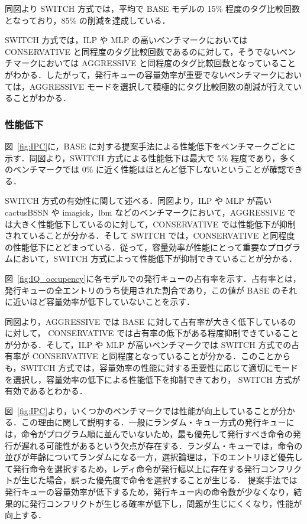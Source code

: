 \documentclass[submit,techrep,noauthor]{ipsj}
\newcommand{\fig}[1]{{図~\ref{fig:#1}}}
\begin{document}
同図より SWITCH 方式では，平均で BASE モデルの 15\% 程度のタグ比較回数となっており，85\% の削減を達成している．

SWITCH 方式では，ILP や MLP の高いベンチマークにおいてはCONSERVATIVE と同程度のタグ比較回数であるのに対して，そうでないベンチマークにおいては AGGRESSIVE と同程度のタグ比較回数となっていることがわかる．したがって，発行キューの容量効率が重要でないベンチマークにおいては，AGGRESSIVE モードを選択して積極的にタグ比較回数の削減が行えていることがわかる．

\subsubsection{性能低下}
\fig{IPC}に，BASE に対する提案手法による性能低下をベンチマークごとに示す．同図より，SWITCH 方式による性能低下は最大で 5\% 程度であり，多くのベンチマークでは 0\% に近く性能はほとんど低下しないということが確認できる．

SWITCH 方式の有効性に関して述べる．同図より，ILP や MLP が高い cactusBSSN や imagick，lbm などのベンチマークにおいて，AGGRESSIVE では大きく性能低下しているのに対して，CONSERVATIVE では性能低下が抑制されていることが分かる．そして SWITCH では，CONSERVATIVE と同程度の性能低下にとどまっている．従って，容量効率が性能にとって重要なプログラムにおいて，SWITCH 方式によって性能低下が抑制できていることが分かる．

\fig{IQ_occupency}に各モデルでの発行キューの占有率を示す．占有率とは，発行キューの全エントリのうち使用された割合であり，この値が BASE のそれに近いほど容量効率が低下していないことを示す．

同図より，AGGRESSIVE では BASE に対して占有率が大きく低下しているのに対して， CONSERVATIVE では占有率の低下がある程度抑制できていることが分かる．そして，ILP や MLP が高いベンチマークでは SWITCH 方式での占有率が CONSERVATIVE と同程度となっていることが分かる．このことからも，SWITCH 方式では，容量効率の性能に対する重要性に応じて適切にモードを選択し，容量効率の低下による性能低下を抑制できており， SWITCH 方式が有効であるとわかる．

\fig{IPC}より，いくつかのベンチマークでは性能が向上していることが分かる．この理由に関して説明する．一般にランダム・キュー方式の発行キューには，命令がプログラム順に並んでいないため，最も優先して発行すべき命令の発行が遅れる可能性があるという欠点が存在する．ランダム・キューでは，命令の並びが年齢についてランダムになる一方，選択論理は，下のエントリほど優先して発行命令を選択するため，レディ命令が発行幅以上に存在する発行コンフリクトが生じた場合，誤った優先度で命令を選択することが生じる．
提案手法では発行キューの容量効率が低下するため，発行キュー内の命令数が少なくなり，結果的に発行コンフリクトが生じる確率が低下し，問題が生じにくくなり，性能が向上する．
\end{document}

